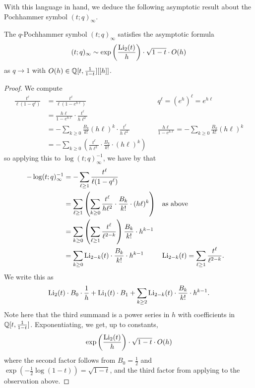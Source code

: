 With this language in hand, we deduce the following asymptotic result about the Pochhammer symbol $(t;q)_{\infty}$. 
\begin{proposition}\label{prop: asymptotics q t Pochhammer at 1}
    The $q$-Pochhammer symbol $(t;q)_{\infty}$ satisfies the asymptotic formula
    \begin{equation}\label{eqn: asymptotics of q t Pochhammer at 1}
        (t;q)_{\infty}\sim\exp\left(\frac{\mathrm{Li}_{2}(t)}{h}\right)\cdot\sqrt{1-t}\cdot O(h)
    \end{equation}
    as $q\to 1$ with $O(h)\in\mathbb{Q}[t,\frac{1}{1-t}][[h]]$. 
\end{proposition}
\begin{proof}
    We compute 
    \begin{align*}
        \frac{t^{\ell}}{\ell(1-q^{\ell})} &= \frac{t^{\ell}}{\ell(1-e^{h\ell})} && q^{\ell}=(e^{h})^{\ell}=e^{h\ell}\\
        &= \frac{h\ell}{1-e^{h\ell}}\cdot\frac{t^{\ell}}{h\ell^{2}} \\
        &= -\sum_{k\geq0}\frac{B_{k}}{k!}(h\ell)^{k}\cdot\frac{t^{\ell}}{h\ell^{2}} && \frac{h\ell}{1-e^{h\ell}}=-\sum_{k\geq0}\frac{B_{k}}{k!}(h\ell)^{k} \\
        &= -\sum_{k\geq0}\left(\frac{t^{\ell}}{h\ell^{2}}\cdot\frac{B_{k}}{k!}\cdot(h\ell)^{k}\right)
    \end{align*}
    so applying this to $\log(t;q)_{\infty}^{-1}$, we have by  that
    \begin{align*}
        -\log(t;q)_{\infty}^{-1} &= -\sum_{\ell\geq1}\frac{t^{\ell}}{\ell(1-q^{\ell})} \\ 
        &= \sum_{\ell\geq1}\left(\sum_{k\geq0}\frac{t^{\ell}}{h\ell^{2}}\cdot\frac{B_{k}}{k!}\cdot(h\ell)^{k}\right)&& \text{as above} \\
        &= \sum_{k\geq0}\left(\sum_{\ell\geq1}\frac{t^{\ell}}{\ell^{2-k}}\right)\frac{B_{k}}{k!}\cdot h^{k-1} && \\
        &= \sum_{k\geq0}\mathrm{Li}_{2-k}(t)\cdot\frac{B_{k}}{k!}\cdot h^{k-1} && \mathrm{Li}_{2-k}(t)=\sum_{\ell\geq1}\frac{t^{\ell}}{\ell^{2-k}}.
    \end{align*}
    We write this as 
    $$\mathrm{Li}_{2}(t)\cdot B_{0}\cdot\frac{1}{h} + \mathrm{Li}_{1}(t)\cdot B_{1}+\sum_{k\geq2}\mathrm{Li}_{2-k}(t)\cdot\frac{B_{k}}{k!}\cdot h^{k-1}.$$
    Note here that the third summand is a power series in $h$ with coefficients in $\mathbb{Q}[t,\frac{1}{1-t}]$. Exponentiating, we get, up to constants, 
    $$\exp\left(\frac{\mathrm{Li}_{2}(t)}{h}\right)\cdot\sqrt{1-t}\cdot O(h)$$
    where the second factor follows from $B_{0}=\frac{1}{2}$ and $\exp(-\frac{1}{2}\log(1-t))=\sqrt{1-t}$, and the third factor from applying  to the observation above. 
\end{proof}
